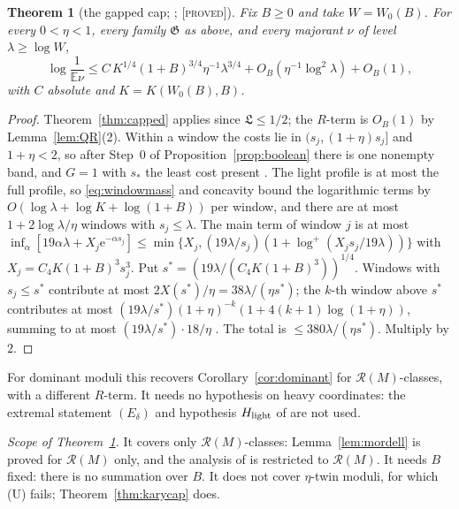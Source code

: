 \documentclass[10pt,reqno]{amsart}
\newtheorem{theorem}{Theorem}[section]
\theoremstyle{definition}
\theoremstyle{remark}
\newcommand{\cR}{\mathscr R}
\newcommand{\cG}{\mathfrak G}
\newcommand{\E}{\mathbb E}
\newcommand{\e}{\mathrm e}
\newcommand{\lab}[1]{\textup{[\textsc{#1}]}}
\begin{document}
\begin{theorem}[the gapped cap; {\cite[Thm~2.7]{TW}}; \lab{proved}]\label{thm:gapped}
Fix $B\geq0$ and take $W=W_0(B)$.  For every $0<\eta<1$, every family
$\cG$ as above, and every majorant $\nu$ of level $\lambda\geq\log W$,
\[
 \log\frac1{\E\nu}\leq C\,K^{1/4}(1+B)^{3/4}\eta^{-1}\lambda^{3/4}
 +O_B(\eta^{-1}\log^2\lambda)+O_B(1),
\]
with $C$ absolute and $K=K(W_0(B),B)$.
\end{theorem}
\begin{proof}
Theorem~\ref{thm:capped} applies since $\mathfrak L\leq1/2$; the $R$-term
is $O_B(1)$ by Lemma~\ref{lem:QR}(2).  Within a window the costs lie in
$(s_j,(1+\eta)s_j]$ and $1+\eta<2$, so after Step~0 of
Proposition~\ref{prop:boolean} there is one nonempty band, and $G=1$ with
$s_*$ the least cost present \cite[Lemma~2.5a]{EB}.  The light profile is
at most the full profile, so \eqref{eq:windowmass} and concavity bound
the logarithmic terms by $O(\log\lambda+\log K+\log(1+B))$ per window,
and there are at most $1+2\log\lambda/\eta$ windows with $s_j\leq\lambda$.
The main term of window $j$ is at most
$\inf_\alpha[19\alpha\lambda+X_j\e^{-\alpha s_j}]
\leq\min\{X_j,(19\lambda/s_j)(1+\log^+(X_js_j/19\lambda))\}$ with
$X_j=C_4K(1+B)^3s_j^3$.  Put $s^*=(19\lambda/(C_4K(1+B)^3))^{1/4}$.  Windows
with $s_j\leq s^*$ contribute at most $2X(s^*)/\eta=38\lambda/(\eta s^*)$; the
$k$-th window above $s^*$ contributes at most
$(19\lambda/s^*)(1+\eta)^{-k}(1+4(k+1)\log(1+\eta))$, summing to at most
$(19\lambda/s^*)\cdot18/\eta$ \cite[proof of Thm~2.5]{EB}.  The total is
$\leq380\lambda/(\eta s^*)$.  Multiply by $2$.
\end{proof}
For dominant moduli this recovers Corollary~\ref{cor:dominant} for
$\cR(M)$-classes, with a different $R$-term.  It needs no hypothesis on
heavy coordinates: the extremal statement $(E_\delta)$ and hypothesis
$H_{\rm light}$ of \cite[\S\S2.5, 4.4]{EB} are not used.

\emph{Scope of Theorem~\ref{thm:gapped}.}  It covers only $\cR(M)$-classes:
Lemma~\ref{lem:mordell} is proved for $\cR(M)$ only, and the analysis of
\cite{EB} is restricted to $\cR(M)$.  It needs $B$ fixed: there is no
summation over $B$.  It does not cover $\eta$-twin moduli, for which (U)
fails; Theorem~\ref{thm:karycap} does.
\end{document}

